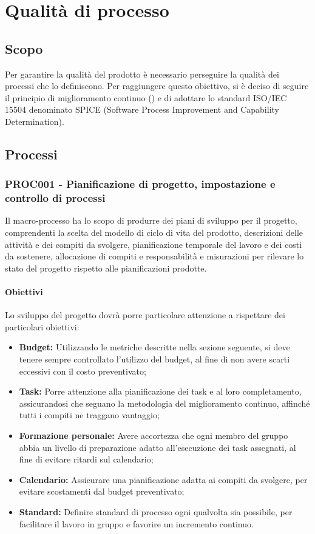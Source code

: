 \documentclass[PianoDiQualifica.tex]{subfiles}
\begin{document}
\chapter{Qualità di processo}

\section{Scopo} 
Per garantire la qualità del prodotto è necessario perseguire la qualità dei processi che lo definiscono.
Per raggiungere questo obiettivo, si è deciso di seguire il principio di miglioramento continuo () e di adottare lo standard ISO/IEC 15504 denominato SPICE (Software Process Improvement and Capability Determination).

\section{Processi}

\subsection{PROC001 - Pianificazione di progetto, impostazione e controllo di processi}
Il macro-processo ha lo scopo di produrre dei piani di sviluppo per il progetto, comprendenti la scelta del modello di ciclo di vita del prodotto, descrizioni delle attività e dei compiti da svolgere, pianificazione temporale del lavoro e dei costi da sostenere, allocazione di compiti e responsabilità e misurazioni per rilevare lo stato del progetto rispetto alle pianificazioni prodotte.

\subsubsection{Obiettivi}
Lo sviluppo del progetto dovrà porre particolare attenzione a rispettare dei particolari obiettivi:
\begin{itemize}
	\item \textbf{Budget:} Utilizzando le metriche descritte nella sezione seguente, si deve tenere sempre controllato l'utilizzo del budget, al fine di non avere scarti eccessivi con il costo preventivato;
	\item \textbf{Task:} Porre attenzione alla pianificazione dei task e al loro completamento, assicurandosi che seguano la metodologia del miglioramento continuo, affinché tutti i compiti ne traggano vantaggio;
	\item \textbf{Formazione personale:} Avere accortezza che ogni membro del gruppo abbia un livello di preparazione adatto all'esecuzione dei task assegnati, al fine di evitare ritardi sul calendario;
	\item \textbf{Calendario:} Assicurare una pianificazione adatta ai compiti da svolgere, per evitare scostamenti dal budget preventivato;
	\item \textbf{Standard:} Definire standard di processo ogni qualvolta sia possibile, per facilitare il lavoro in gruppo e favorire un incremento continuo.
\end{itemize}
\end{document}

